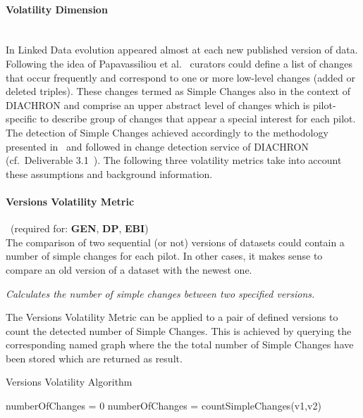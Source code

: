 \paragraph{Volatility Dimension}~\\ %
In Linked Data evolution appeared almost at each new published version of data. Following the idea of Papavassiliou et al.~\cite{TODS13} curators could define a list of changes that occur frequently and correspond to one or more low-level changes (added or deleted triples). These changes termed as Simple Changes also in the context of DIACHRON and comprise an upper abstract level of changes which is pilot-specific to describe group of changes that appear a special interest for each pilot. The detection of Simple Changes achieved accordingly to the methodology presented in~\cite{TODS13} and followed in change detection service of DIACHRON (cf.\ Deliverable 3.1~\cite{diachron-d3.1}). The following three volatility metrics take into account these assumptions and background information.

\paragraph{Versions Volatility Metric}~(required for: \textbf{GEN}, \textbf{DP}, \textbf{EBI})~\\ %
The comparison of two sequential (or not) versions of datasets could contain a number of simple changes for each pilot. In other cases, it makes sense to compare an old version of a dataset with the newest one. 

\begin{mdframed}[style=metricdefinition]
\emph{Calculates the number of simple changes between two specified versions.}
\end{mdframed}

The Versions Volatility Metric can be applied to a pair
of defined versions to count the detected number of Simple Changes. This is achieved by querying the corresponding named graph where the the total number of Simple Changes have been stored which are returned as result. 

\begin{algorithm}
\caption{Versions Volatility Algorithm}
\begin{algorithmic}[1]
\State numberOfChanges = 0
\EndProcedure
{}
\State numberOfChanges = countSimpleChanges(v1,v2)
\EndProcedure
\end{algorithmic}
\end{algorithm}

